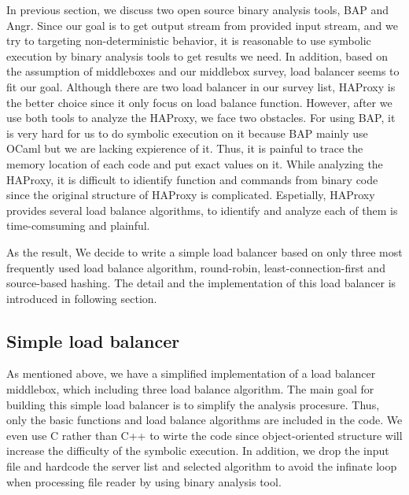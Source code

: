 In previous section, we discuss two open source binary analysis tools, BAP and Angr.
Since our goal is to get output stream from provided input stream, and we try to targeting non-deterministic behavior, it is reasonable to use symbolic execution by binary analysis tools to get results we need.
In addition, based on the assumption of middleboxes and our middlebox survey, load balancer seems to fit our goal.
Although there are two load balancer in our survey list, HAProxy is the better choice since it only focus on load balance function.
However, after we use both tools to analyze the HAProxy, we face two obstacles.
\ci For using BAP, it is very hard for us to do symbolic execution on it because BAP mainly use OCaml but we are lacking expierence of it.
Thus, it is painful to trace the memory location of each code and put exact values on it.
\cii While analyzing the HAProxy, it is difficult to idientify function and commands from binary code since the original structure of HAProxy is complicated.
Espetially, HAProxy provides several load balance algorithms, to idientify and analyze each of them is time-comsuming and plainful.

As the result, We decide to write a simple load balancer based on only three most frequently used load balance algorithm, \ca round-robin, \cb least-connection-first and \cc source-based hashing.
The detail and the implementation of this load balancer is introduced in following section.

\subsection{Simple load balancer}

As mentioned above, we have a simplified implementation of a load balancer
middlebox, which including three load balance algorithm.
The main goal for building this simple load balancer is to simplify the analysis procesure.
Thus, only the basic functions and load balance algorithms are included in the code.
We even use C rather than C++ to wirte the code since object-oriented structure will increase the difficulty of the symbolic execution.
In addition, we drop the input file and hardcode the server list and selected algorithm to avoid the infinate loop when processing file reader by using binary analysis tool.

